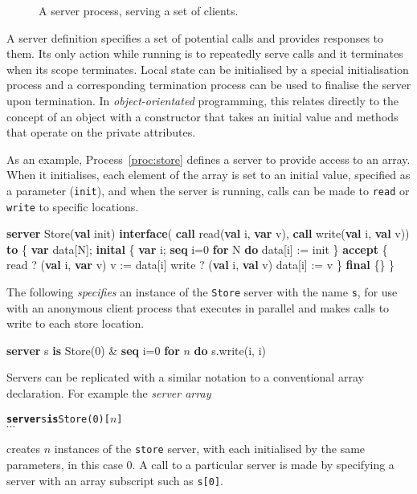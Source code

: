 \documentclass[11pt, conference, compsocconf, onecolumn]{IEEEtran}
\newcommand{\ttt}[1]{\texttt{#1}}
\newcommand{\proc}[1]{Process~\ref{proc:#1}}
\newcounter{process}
\newenvironment{Process}[1][]{\begin{procfloat}[ht]\vspace{-1.5mm}\refstepcounter{process}{\bf Process~\theprocess} #1}
{\vspace{-3.5mm}\end{procfloat}}
\newcommand{\w}[1]{{\bf #1}}
\newcommand{\inputtikz}[1]{
\begin{center}\end{center}}
\def\codespacing{1.5mm}
\newenvironment{myquote}
{\list{}{\leftmargin=4mm\rightmargin=4mm}\item[]}
{\endlist}
\newenvironment{code*}{\vspace{\codespacing}\begin{myquote}\begin{minipage}{\linewidth}\begin{alltt}}
{\end{alltt}\end{minipage}
\end{myquote}\vspace{\codespacing}
}
\newcommand{\code}[1]{
\vspace{\codespacing}\begin{myquote}\begin{alltt}#1\end{alltt}\end{myquote}\vspace{\codespacing}
}
\begin{document}
\begin{figure}[t]
\inputtikz{figures/server}

\caption{A server process, serving a set of clients.}

\label{fig:server}
\end{figure}

A server definition specifies a set of potential calls and provides responses
to them.  Its only action while running is to repeatedly serve calls and it
terminates when its scope terminates.  Local state can be initialised by a
special initialisation process and a corresponding termination process can be
used to finalise the server upon termination.
In \emph{object-orientated} programming, this relates directly to the concept
of an object with a constructor that takes an initial value and methods that
operate on the private attributes.

As an example, \proc{store} defines a server to provide access to an array.
When it initialises, each element of the array is set to an initial value,
specified as a parameter (\ttt{init}), and when the server is running, calls
can be made to \ttt{read} or \ttt{write} to specific locations. 
\begin{Process}
\begin{code*}
\w{server} Store(\w{val} init)
  \w{interface}(
    \w{call} read(\w{val} i, \w{var} v), 
    \w{call} write(\w{val} i, \w{val} v)) \w{to}
\{ \w{var} data[N];
  \w{inital}
  \{ \w{var} i;
    \w{seq} i=0 \w{for} N \w{do}
      data[i] := init
  \}
  \w{accept}
  \{ read ? (\w{val} i, \w{var} v)
      v := data[i]
    write ? (\w{val} i, \w{val} v)
      data[i] := v
  \}
  \w{final} \{\}
\}
\end{code*}
\label{proc:store}
\end{Process}

The following \emph{specifies} an instance of the \ttt{Store} server with the
name \ttt{s}, for use with an anonymous client process that executes in
parallel and makes calls to write to each store location.
\begin{code*}
\w{server} s \w{is} Store(0) \&
\w{seq} i=0 \w{for} \(n\) \w{do} s.write(i, i)
\end{code*}

Servers can be replicated with a similar notation to a conventional array
declaration. For example the \emph{server array}
\code{\w{server} s \w{is} Store(0)[\(n\)]\\$\cdots$}
creates $n$ instances of the \ttt{store} server, with each initialised by the
same parameters, in this case 0.  A call to a particular server is made by
specifying a server with an array subscript such as \ttt{s[0]}.
\inputtikz{figures/server-replicated}
\end{document}
